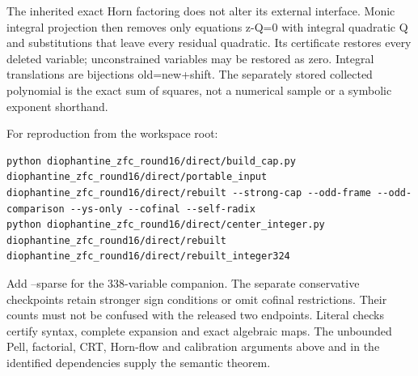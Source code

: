 The inherited exact Horn factoring does not alter its external interface. Monic integral projection then removes only equations z-Q=\allowbreak{}0 with integral quadratic Q and substitutions that leave every residual quadratic. Its certificate restores every deleted variable; unconstrained variables may be restored as zero. Integral translations are bijections old=\allowbreak{}new+\allowbreak{}shift. The separately stored collected polynomial is the exact sum of squares, not a numerical sample or a symbolic exponent shorthand.



For reproduction from the workspace root:



\begin{verbatim}
python diophantine_zfc_round16/direct/build_cap.py diophantine_zfc_round16/direct/portable_input diophantine_zfc_round16/direct/rebuilt --strong-cap --odd-frame --odd-comparison --ys-only --cofinal --self-radix
python diophantine_zfc_round16/direct/center_integer.py diophantine_zfc_round16/direct/rebuilt diophantine_zfc_round16/direct/rebuilt_integer324
\end{verbatim}

Add --sparse for the 338-variable companion. The separate conservative checkpoints retain stronger sign conditions or omit cofinal restrictions. Their counts must not be confused with the released two endpoints. Literal checks certify syntax, complete expansion and exact algebraic maps. The unbounded Pell, factorial, CRT, Horn-flow and calibration arguments above and in the identified dependencies supply the semantic theorem.
